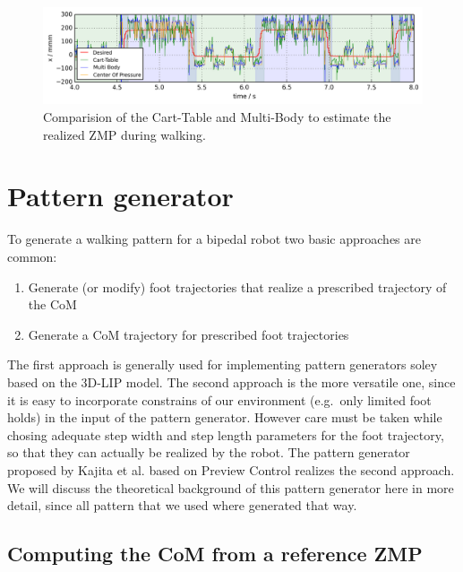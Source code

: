 \documentclass[english,ngerman]{KITreprt}
\begin{document}
\begin{figure}[tb]
\includegraphics[width=\textwidth,resolution=300]{images/zmp_comparison.png}
\caption{Comparision of the Cart-Table and Multi-Body to estimate the realized ZMP during walking.}
\label{img:zmp-comparison}
\end{figure}

\chapter{Pattern generator}\label{pattern-generator}

To generate a walking pattern for a bipedal robot two basic approaches
are common:

\begin{enumerate}
\def\labelenumi{\arabic{enumi}.}
\item
  Generate (or modify) foot trajectories that realize a prescribed
  trajectory of the CoM
\item
  Generate a CoM trajectory for prescribed foot trajectories
\end{enumerate}

The first approach is generally used for implementing pattern generators
soley based on the 3D-LIP model. \cite{kajita20013d} The second approach
is the more versatile one, since it is easy to incorporate constrains of
our environment (e.g.~only limited foot holds) in the input of the
pattern generator. However care must be taken while chosing adequate
step width and step length parameters for the foot trajectory, so that
they can actually be realized by the robot. The pattern generator
proposed by Kajita et al. \cite{kajita2003biped} based on Preview
Control realizes the second approach. We will discuss the theoretical
background of this pattern generator here in more detail, since all
pattern that we used where generated that way.

\section{Computing the CoM from a reference
ZMP}\label{computing-the-com-from-a-reference-zmp}
\end{document}
